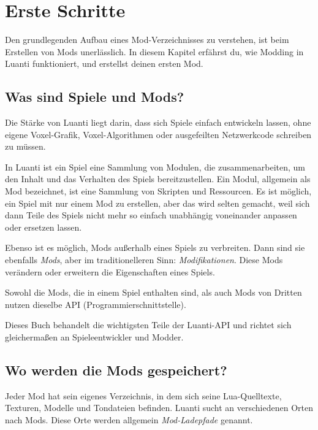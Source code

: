 \chapter{Erste Schritte}
\label{ch:basics/getting-started}

Den grundlegenden Aufbau eines Mod-Verzeichnisses zu verstehen, ist beim
Erstellen von Mods unerlässlich. In diesem Kapitel erfährst du, wie
Modding in Luanti funktioniert, und erstellst deinen ersten Mod.

\section{Was sind Spiele und Mods?}\label{was-sind-spiele-und-mods}

Die Stärke von Luanti liegt darin, dass sich Spiele einfach entwickeln
lassen, ohne eigene Voxel-Grafik, Voxel-Algorithmen oder ausgefeilten
Netzwerkcode schreiben zu müssen.

In Luanti ist ein Spiel eine Sammlung von Modulen, die zusammenarbeiten,
um den Inhalt und das Verhalten des Spiels bereitzustellen. Ein Modul,
allgemein als Mod bezeichnet, ist eine Sammlung von Skripten und
Ressourcen. Es ist möglich, ein Spiel mit nur einem Mod zu erstellen,
aber das wird selten gemacht, weil sich dann Teile des Spiels nicht mehr
so einfach unabhängig voneinander anpassen oder ersetzen lassen.

Ebenso ist es möglich, Mods außerhalb eines Spiels zu verbreiten. Dann
sind sie ebenfalls \emph{Mods}, aber im traditionelleren Sinn:
\emph{Modifikationen}. Diese Mods verändern oder erweitern die
Eigenschaften eines Spiels.

Sowohl die Mods, die in einem Spiel enthalten sind, als auch Mods von
Dritten nutzen dieselbe API (Programmierschnittstelle).

Dieses Buch behandelt die wichtigsten Teile der Luanti-API und richtet
sich gleichermaßen an Spieleentwickler und Modder.

\section{Wo werden die Mods
gespeichert?}\label{wo-werden-die-mods-gespeichert}

Jeder Mod hat sein eigenes Verzeichnis, in dem sich seine
Lua-Quelltexte, Texturen, Modelle und Tondateien
befinden. Luanti sucht an verschiedenen Orten nach Mods. Diese Orte
werden allgemein \emph{Mod-Ladepfade} genannt.

